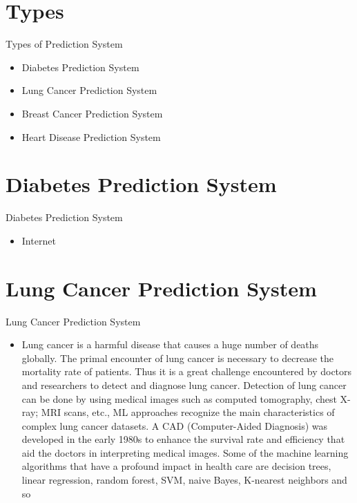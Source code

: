 \documentclass{SKP-beamer}
\begin{document}
\section{\textbf{Types}}

\begin{frame}{Types of Prediction System}
	\begin{itemize}
		\item Diabetes Prediction System
		\item Lung Cancer Prediction System
		\item Breast Cancer Prediction System
		\item Heart Disease Prediction System	
	\end{itemize}
\end{frame}



\section{\textbf{Diabetes Prediction System}}

\begin{frame}{Diabetes Prediction System}
	\begin{itemize}
		\item Internet
			
	\end{itemize}
\end{frame}

\section{\textbf{Lung Cancer Prediction System}}

\begin{frame}{Lung Cancer Prediction System}
\begin{itemize}
	\item Lung cancer is a harmful disease that causes a huge number of
	deaths globally. The primal encounter of lung cancer is
	necessary to decrease the mortality rate of patients. Thus it is a
	great challenge encountered by doctors and researchers to
	detect and diagnose lung cancer. Detection of lung cancer can
	be done by using medical images such as computed
	tomography, chest X-ray; MRI scans, etc., ML approaches
	recognize the main characteristics of complex lung cancer
	datasets. A CAD (Computer-Aided Diagnosis) was developed
	in the early 1980s to enhance the survival rate and efficiency
	that aid the doctors in interpreting medical images. Some of the
	machine learning algorithms that have a profound impact in
	health care are decision trees, linear regression, random forest,
	SVM, naive Bayes, K-nearest neighbors and so 
\end{itemize}
\end{frame}
\end{document}
